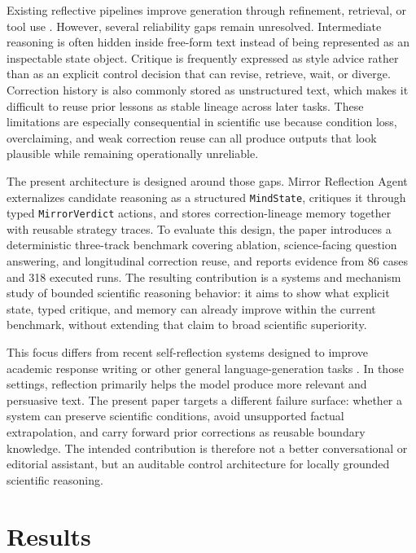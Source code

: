 \documentclass[12pt]{article}
\begin{document}
Existing reflective pipelines improve generation through refinement, retrieval, or tool use \cite{selfrefine,reflexion,critic,selfrag}. However, several reliability gaps remain unresolved. Intermediate reasoning is often hidden inside free-form text instead of being represented as an inspectable state object. Critique is frequently expressed as style advice rather than as an explicit control decision that can revise, retrieve, wait, or diverge. Correction history is also commonly stored as unstructured text, which makes it difficult to reuse prior lessons as stable lineage across later tasks. These limitations are especially consequential in scientific use because condition loss, overclaiming, and weak correction reuse can all produce outputs that look plausible while remaining operationally unreliable.

The present architecture is designed around those gaps. Mirror Reflection Agent externalizes candidate reasoning as a structured \texttt{MindState}, critiques it through typed \texttt{MirrorVerdict} actions, and stores correction-lineage memory together with reusable strategy traces. To evaluate this design, the paper introduces a deterministic three-track benchmark covering ablation, science-facing question answering, and longitudinal correction reuse, and reports evidence from 86 cases and 318 executed runs. The resulting contribution is a systems and mechanism study of bounded scientific reasoning behavior: it aims to show what explicit state, typed critique, and memory can already improve within the current benchmark, without extending that claim to broad scientific superiority.

This focus differs from recent self-reflection systems designed to improve academic response writing or other general language-generation tasks \cite{academicresponse}. In those settings, reflection primarily helps the model produce more relevant and persuasive text. The present paper targets a different failure surface: whether a system can preserve scientific conditions, avoid unsupported factual extrapolation, and carry forward prior corrections as reusable boundary knowledge. The intended contribution is therefore not a better conversational or editorial assistant, but an auditable control architecture for locally grounded scientific reasoning.

\section{Results}
\end{document}
